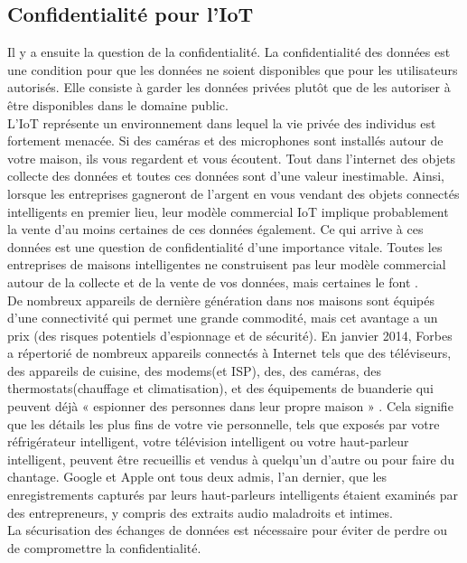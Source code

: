 	\subsection{Conf{\kern0pt}identialité pour l’IoT}
Il y a ensuite la question de la conf{\kern0pt}identialité. La conf{\kern0pt}identialité des données est une condition pour que les données ne soient disponibles que pour les utilisateurs autorisés. Elle consiste à garder les données privées plutôt que de les autoriser à être disponibles dans le domaine public.\\
L’IoT représente un environnement dans lequel la vie privée des individus est fortement menacée. Si des caméras et des microphones sont installés autour de votre maison, ils vous regardent et vous écoutent. Tout dans l'internet des objets collecte des données et toutes ces données sont d’une valeur inestimable. Ainsi, lorsque les entreprises gagneront de l'argent en vous vendant des objets connectés intelligents en premier lieu, leur modèle commercial IoT implique probablement la vente d'au moins certaines de ces données également. Ce qui arrive à ces données est une question de conf{\kern0pt}identialité d'une importance vitale. Toutes les entreprises de maisons intelligentes ne construisent pas leur modèle commercial autour de la collecte et de la vente de vos données, mais certaines le font \cite{ranger2020iot}.\\

De nombreux appareils de dernière génération dans nos maisons sont équipés d'une connectivité qui permet une grande commodité, mais cet avantage a un prix (des risques potentiels d'espionnage et de sécurité). En janvier 2014, Forbes a répertorié de nombreux appareils connectés à Internet tels que des téléviseurs, des appareils de cuisine, des modems(et ISP), des, des caméras, des thermostats(chauf{\kern0pt}fage et climatisation), et des équipements de buanderie qui peuvent déjà « espionner des personnes dans leur propre maison » \cite{steinberg2014spying}. Cela signif{\kern0pt}ie que les détails les plus f{\kern0pt}ins de votre vie personnelle, tels que exposés par votre réfrigérateur intelligent, votre télévision intelligent ou votre haut-parleur intelligent, peuvent être recueillis et vendus à quelqu'un d'autre ou pour faire du chantage. Google et Apple ont tous deux admis, l'an dernier, que les enregistrements capturés par leurs haut-parleurs intelligents étaient examinés par des entrepreneurs, y compris des extraits audio maladroits et intimes.\\
La sécurisation des échanges de données est nécessaire pour éviter de perdre ou de compromettre la conf{\kern0pt}identialité.


